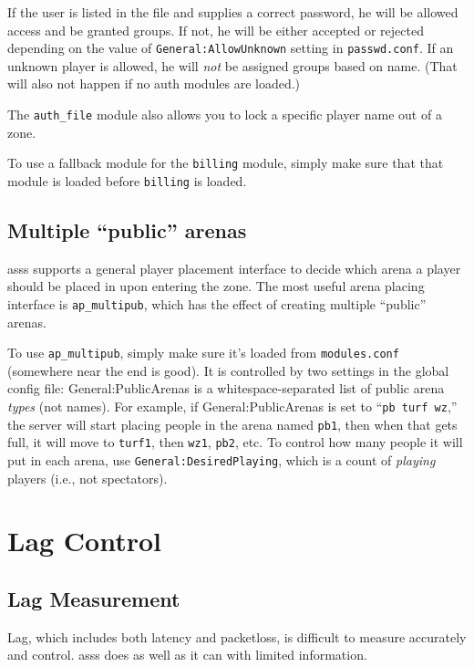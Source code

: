 \documentclass{article}
\newcommand{\asss}{asss}
\begin{document}
If the user is listed in the file and supplies a correct password, he
will be allowed access and be granted groups. If not, he will be either
accepted or rejected depending on the value of
\verb/General:AllowUnknown/ setting in \verb/passwd.conf/. If an unknown
player is allowed, he will \emph{not} be assigned groups based on name.
(That will also not happen if no auth modules are loaded.)

The \verb/auth_file/ module also allows you to lock a specific player
name out of a zone.

To use a fallback module for the \verb/billing/ module, simply make sure
that that module is loaded before \verb/billing/ is loaded.


\subsection{Multiple ``public'' arenas}

\asss{} supports a general player placement interface to decide which
arena a player should be placed in upon entering the zone. The most
useful arena placing interface is \verb/ap_multipub/, which has the
effect of creating multiple ``public'' arenas.

To use \verb/ap_multipub/, simply make sure it's loaded from
\verb/modules.conf/ (somewhere near the end is good). It is controlled
by two settings in the global config file: General:PublicArenas is a
whitespace-separated list of public arena \emph{types} (not names). For
example, if General:PublicArenas is set to ``\verb/pb turf wz/,'' the
server will start placing people in the arena named \verb/pb1/, then
when that gets full, it will move to \verb/turf1/, then \verb/wz1/,
\verb/pb2/, etc. To control how many people it will put in each arena,
use \verb/General:DesiredPlaying/, which is a count of \emph{playing}
players (i.e., not spectators).


\section{Lag Control}

\subsection{Lag Measurement}

Lag, which includes both latency and packetloss, is difficult to measure
accurately and control. \asss{} does as well as it can with limited
information.
\end{document}
